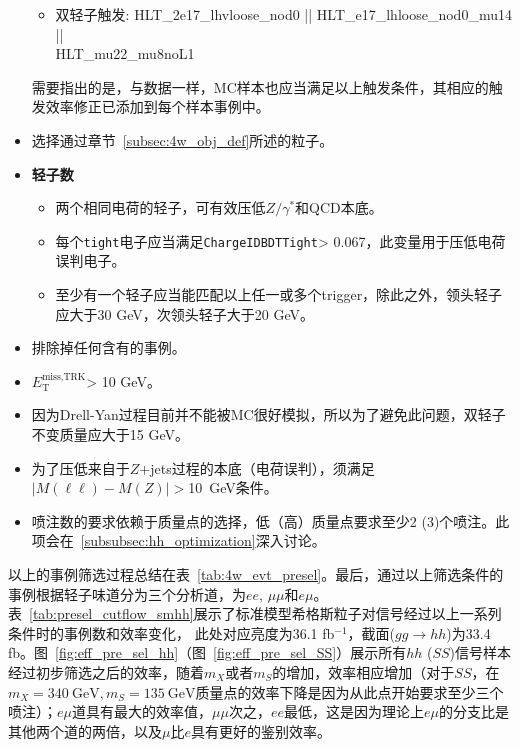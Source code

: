 \begin{itemize}
\begin{itemize}
    \item 双轻子触发: HLT\_2e17\_lhvloose\_nod0 || HLT\_e17\_lhloose\_nod0\_mu14 ||\\
     HLT\_mu22\_mu8noL1 
  \end{itemize}
 需要指出的是，与数据一样，MC样本也应当满足以上触发条件，其相应的触发效率修正已添加到每个样本事例中。
  \item 选择通过章节~\ref{subsec:4w_obj_def}所述的粒子。
  \item \textbf{轻子数}
	\begin{itemize}
	      \item 两个相同电荷的轻子，可有效压低$Z/\gamma^*$和QCD本底。
	      \item 每个\texttt{tight}电子应当满足\texttt{ChargeIDBDTTight}> 0.067，此变量用于压低电荷误判电子。
	      \item 至少有一个轻子应当能匹配以上任一或多个trigger，除此之外，领头轻子\pt 应大于30 GeV，次领头轻子大于20 GeV。
	\end{itemize}
  \item 排除掉任何含有\bjet 的事例。
  \item $E_{\text{T}}^{\text{miss,TRK}}$> 10 GeV。
  \item 因为Drell-Yan过程目前并不能被MC很好模拟，所以为了避免此问题，双轻子不变质量应大于15 GeV。
  \item 为了压低来自于$Z$+jets过程的本底（电荷误判），须满足$|M(\ell\ell)-M(Z)|>$10~GeV条件。
  \item 喷注数的要求依赖于质量点的选择，低（高）质量点要求至少2 (3)个喷注。此项会在~\ref{subsubsec:hh_optimization}深入讨论。
\end{itemize}

以上的事例筛选过程总结在表~\ref{tab:4w_evt_presel}。最后，通过以上筛选条件的事例根据轻子味道分为三个分析道，为$ee$,
$\mu\mu$和$e\mu$。表~\ref{tab:presel_cutflow_smhh}展示了标准模型希格斯粒子对信号经过以上一系列条件时的事例数和效率变化，
此处对应亮度为36.1 fb$^{-1}$，截面($gg\rightarrow hh$)为33.4 fb。图~\ref{fig:eff_pre_sel_hh}（图~\ref{fig:eff_pre_sel_SS}）展示所有$hh$ ($SS$)信号样本经过初步筛选之后的效率，随着$m_X$或者$m_S$的增加，效率相应增加（对于$SS$，在$m_X=340~\text{GeV}, m_S=135~\text{GeV}$质量点的效率下降是因为从此点开始要求至少三个喷注）；$e\mu$道具有最大的效率值，$\mu\mu$次之，$ee$最低，这是因为理论上$e\mu$的分支比是其他两个道的两倍，以及$\mu$比$e$具有更好的鉴别效率。



